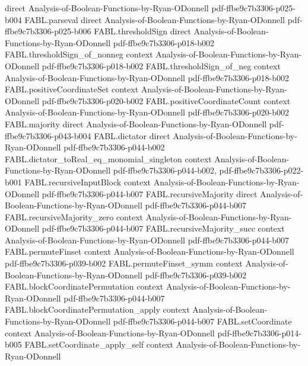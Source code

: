 \begin{theorem}
  {direct}
  {Analysis-of-Boolean-Functions-by-Ryan-ODonnell}
  {pdf-ffbe9c7b3306-p025-b004}
\proofstep
  {FABL.parseval}
  {direct}
  {Analysis-of-Boolean-Functions-by-Ryan-ODonnell}
  {pdf-ffbe9c7b3306-p025-b006}
\proofstep
  {FABL.thresholdSign}
  {direct}
  {Analysis-of-Boolean-Functions-by-Ryan-ODonnell}
  {pdf-ffbe9c7b3306-p018-b002}
\proofstep
  {FABL.thresholdSign_of_nonneg}
  {context}
  {Analysis-of-Boolean-Functions-by-Ryan-ODonnell}
  {pdf-ffbe9c7b3306-p018-b002}
\proofstep
  {FABL.thresholdSign_of_neg}
  {context}
  {Analysis-of-Boolean-Functions-by-Ryan-ODonnell}
  {pdf-ffbe9c7b3306-p018-b002}
\proofstep
  {FABL.positiveCoordinateSet}
  {context}
  {Analysis-of-Boolean-Functions-by-Ryan-ODonnell}
  {pdf-ffbe9c7b3306-p020-b002}
\proofstep
  {FABL.positiveCoordinateCount}
  {context}
  {Analysis-of-Boolean-Functions-by-Ryan-ODonnell}
  {pdf-ffbe9c7b3306-p020-b002}
\proofstep
  {FABL.majority}
  {direct}
  {Analysis-of-Boolean-Functions-by-Ryan-ODonnell}
  {pdf-ffbe9c7b3306-p043-b004}
\proofstep
  {FABL.dictator}
  {direct}
  {Analysis-of-Boolean-Functions-by-Ryan-ODonnell}
  {pdf-ffbe9c7b3306-p044-b002}
\proofstep
  {FABL.dictator_toReal_eq_monomial_singleton}
  {context}
  {Analysis-of-Boolean-Functions-by-Ryan-ODonnell}
  {pdf-ffbe9c7b3306-p044-b002,
    pdf-ffbe9c7b3306-p022-b001}
\proofstep
  {FABL.recursiveInputBlock}
  {context}
  {Analysis-of-Boolean-Functions-by-Ryan-ODonnell}
  {pdf-ffbe9c7b3306-p044-b007}
\proofstep
  {FABL.recursiveMajority}
  {direct}
  {Analysis-of-Boolean-Functions-by-Ryan-ODonnell}
  {pdf-ffbe9c7b3306-p044-b007}
\proofstep
  {FABL.recursiveMajority_zero}
  {context}
  {Analysis-of-Boolean-Functions-by-Ryan-ODonnell}
  {pdf-ffbe9c7b3306-p044-b007}
\proofstep
  {FABL.recursiveMajority_succ}
  {context}
  {Analysis-of-Boolean-Functions-by-Ryan-ODonnell}
  {pdf-ffbe9c7b3306-p044-b007}
\proofstep
  {FABL.permuteFinset}
  {context}
  {Analysis-of-Boolean-Functions-by-Ryan-ODonnell}
  {pdf-ffbe9c7b3306-p039-b002}
\proofstep
  {FABL.permuteFinset_symm}
  {context}
  {Analysis-of-Boolean-Functions-by-Ryan-ODonnell}
  {pdf-ffbe9c7b3306-p039-b002}
\proofstep
  {FABL.blockCoordinatePermutation}
  {context}
  {Analysis-of-Boolean-Functions-by-Ryan-ODonnell}
  {pdf-ffbe9c7b3306-p044-b007}
\proofstep
  {FABL.blockCoordinatePermutation_apply}
  {context}
  {Analysis-of-Boolean-Functions-by-Ryan-ODonnell}
  {pdf-ffbe9c7b3306-p044-b007}
\proofstep
  {FABL.setCoordinate}
  {context}
  {Analysis-of-Boolean-Functions-by-Ryan-ODonnell}
  {pdf-ffbe9c7b3306-p014-b005}
\proofstep
  {FABL.setCoordinate_apply_self}
  {context}
  {Analysis-of-Boolean-Functions-by-Ryan-ODonnell}

\end{theorem}
